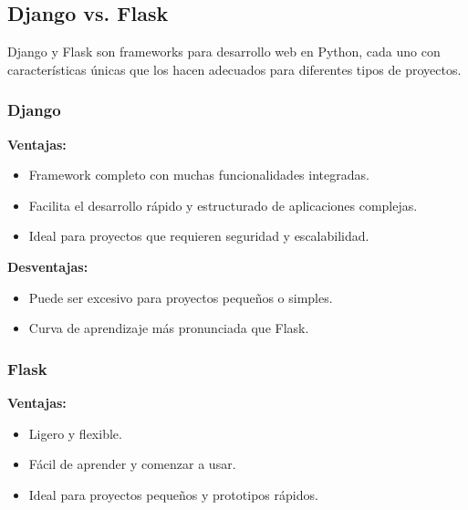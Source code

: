 \documentclass[12pt, a4paper]{article}
\begin{document}
	\vspace{0.5cm}
	
	\subsection*{Django vs. Flask}
	
	Django y Flask son frameworks para desarrollo web en Python, cada uno con características únicas que los hacen adecuados para diferentes tipos de proyectos.
	
	\vspace{0.5cm}
	
	\subsubsection*{Django}
	
	\textbf{Ventajas:}
	\begin{itemize}
		\item Framework completo con muchas funcionalidades integradas.
		\item Facilita el desarrollo rápido y estructurado de aplicaciones complejas.
		\item Ideal para proyectos que requieren seguridad y escalabilidad.
	\end{itemize}
	
	\textbf{Desventajas:}
	\begin{itemize}
		\item Puede ser excesivo para proyectos pequeños o simples.
		\item Curva de aprendizaje más pronunciada que Flask.
	\end{itemize}
	
	\vspace{0.3cm}
	
	\subsubsection*{Flask}
	
	\textbf{Ventajas:}
	\begin{itemize}
		\item Ligero y flexible.
		\item Fácil de aprender y comenzar a usar.
		\item Ideal para proyectos pequeños y prototipos rápidos.
	\end{itemize}
	
\end{document}
